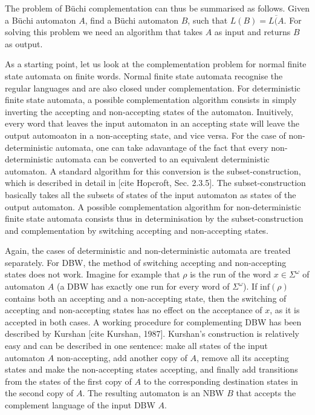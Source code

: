\documentclass{scrreprt}
\begin{document}
The problem of Büchi complementation can thus be summarised as follows. Given a Büchi automaton $A$, find a Büchi automaton $B$, such that $L(B) = \overline{L(A}$. For solving this problem we need an algorithm that takes $A$ as input and returns $B$ as output. 

As a starting point, let us look at the complementation problem for normal finite state automata on finite words. Normal finite state automata recognise the regular languages and are also closed under complementation. For deterministic finite state automata, a possible complementation algorithm consists in simply inverting the accepting and non-accepting states of the automaton. Inuitively, every word that leaves the input automaton in an accepting state will leave the output automoaton in a non-accepting state, and vice versa. For the case of non-deterministic automata, one can take adavantage of the fact that every non-deterministic automata can be converted to an equivalent deterministic automaton. A standard algorithm for this conversion is the subset-construction, which is described in detail in [cite Hopcroft, Sec. 2.3.5]. The subset-construction basically takes all the subsets of states of the input automaton as states of the output automaton. A possible complementation algorithm for non-deterministic finite state automata consists thus in determinisation by the subset-construction and complementation by switching accepting and non-accepting states.

Again, the cases of deterministic and non-deterministic automata are treated separately. For DBW, the method of switching accepting and non-accepting states does not work. Imagine for example that $\rho$ is the run of the word $x \in \Sigma^\omega$ of automaton $A$ (a DBW has exactly one run for every word of $\Sigma^\omega$). If $\textrm{inf}(\rho)$ contains both an accepting and a non-accepting state, then the switching of accepting and non-accepting states has no effect on the acceptance of $x$, as it is accepted in both cases. A working procedure for complementing DBW has been described by Kurshan [cite Kurshan, 1987]. Kurshan's construction is relatively easy and can be described in one sentence: make all states of the input automaton $A$ non-accepting, add another copy of $A$, remove all its accepting states and make the non-accepting states accepting, and finally add transitions from the states of the first copy of $A$ to the corresponding destination states in the second copy of $A$. The resulting automaton is an NBW $B$ that accepts the complement language of the input DBW $A$.
\end{document}
